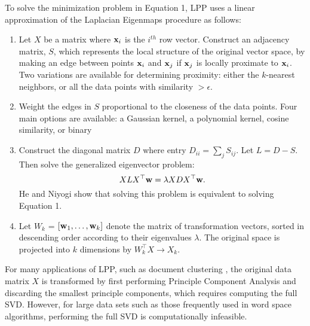 \documentclass[11pt]{article}
\begin{document}
To solve the minimization problem in Equation 1, LPP uses a linear approximation
of the Laplacian Eigenmaps procedure \cite{belkin02laplacian} as follows:
\begin{enumerate}
  \setlength{\itemsep}{1pt}
  \setlength{\parskip}{0pt}
  \setlength{\parsep}{0pt}
  \item Let $X$ be a matrix where ${\bf x}_i$ is the $i^{th}$ row vector. Construct an
    adjacency matrix, $S$, which represents the local structure of the original
    vector space, by making an edge between points ${\bf x}_i$ and ${\bf x}_j$
    if ${\bf x}_j$ is locally proximate to ${\bf x}_i$.  Two variations are
    available for determining proximity: either the $k$-nearest neighbors, or
    all the data points with similarity $ > \epsilon$.

  \item Weight the edges in $S$ proportional to the closeness of the data
    points.  Four main options are available: a Gaussian kernel, a polynomial
    kernel, cosine similarity, or binary %

  \item Construct the diagonal matrix $D$ where entry $D_{ii} = \sum_j
    S_{ij}$. Let $L = D - S$. Then solve the generalized eigenvector problem:
    \begin{equation}
      XLX^{\top}{\bf w} = \lambda XDX^{\top}{\bf w}.
    \end{equation}
    He and Niyogi  show that solving this problem is
    equivalent to solving Equation 1.

  \item Let $W_k$ = $[{\bf w}_1, \ldots, {\bf w}_k]$ denote the matrix of
    transformation vectors, sorted in descending order according to their
    eigenvalues $\lambda$.  The original space is projected into $k$ dimensions
    by $W_k^{\top}X \rightarrow X_k$.
\end{enumerate}

For many applications of LPP, such as document clustering \cite{he04locality},
the original data matrix $X$ is transformed by first performing Principle
Component Analysis and discarding the smallest principle components, which
requires computing the full SVD.  However, for large data sets such as those
frequently used in word space algorithms, performing the full SVD is
computationally infeasible.
\end{document}
